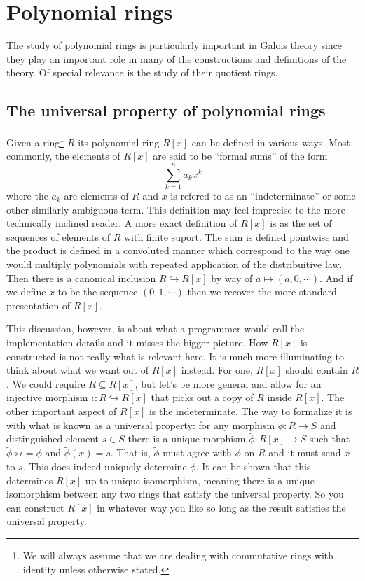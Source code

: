 \documentclass[12pt,oneside]{book}
\numberwithin{table}{section}
\numberwithin{equation}{section}
\numberwithin{figure}{section}
\newcommand{\into}{\hookrightarrow}
\begin{document}
\section{Polynomial rings}
The study of polynomial rings is particularly important in Galois theory since they play an important role in many of the constructions and definitions of the theory. Of special relevance is the study of their quotient rings.  

\subsection{The universal property of polynomial rings}
Given a ring\footnote{We will always assume that we are dealing with commutative rings with identity unless otherwise stated.} \( R \) its polynomial ring \( R[x] \) can be defined in various ways. Most commonly, the elements of \( R[x] \) are said to be ``formal sums'' of the form
\begin{equation*}
	\sum_{k = 1}^{n} a_k x^k 
\end{equation*}
where the \( a_k \) are elements of \( R \) and \( x \) is refered to as an ``indeterminate'' or some other similarly ambiguous term. This definition may feel imprecise to the more technically inclined reader. A more exact definition of \( R[x] \) is as the set of sequences of elements of \( R \) with finite suport. The sum is defined pointwise and the product is defined in a convoluted manner which correspond to the way one would multiply polynomials with repeated application of the distribuitive law. Then there is a canonical inclusion \( R \into R[x] \) by way of \( a \mapsto (a,0, \cdots) \). And if we define \( x \) to be the sequence \( (0,1, \cdots) \) then we recover the more standard presentation of \( R[x] \).

This discussion, however, is about what a programmer would call the implementation details and it misses the bigger picture. How \( R[x] \) is constructed is not really what is relevant here. It is much more illuminating to think about what we want out of \( R[x] \) instead. For one, \( R[x] \) should contain \( R \). We could require \( R \subseteq R[x] \), but let's be more general and allow for an injective morphism \( \iota \colon R \into R[x] \) that picks out a copy of \( R \) inside \( R[x] \). The other important aspect of \( R[x] \) is the indeterminate. The way to formalize it is with what is known as a universal property: for any morphism \( \phi \colon R \to S \) and distinguished element \( s \in S \) there is a unique morphism \( \tilde{\phi} \colon R[x] \to S \) such that \( \tilde{\phi} \circ \iota = \phi \) and \( \tilde{\phi}(x) = s \). That is, \( \tilde{\phi} \) must agree with \( \phi \) on \( R \) and it must send \( x \) to \( s \). This does indeed uniquely determine \( \tilde{\phi} \). It can be shown that this determines \( R[x] \) up to unique isomorphism, meaning there is a unique isomorphism between any two rings that satisfy the universal property. So you can construct \( R[x] \) in whatever way you like so long as the result satisfies the universal property.
\end{document}
